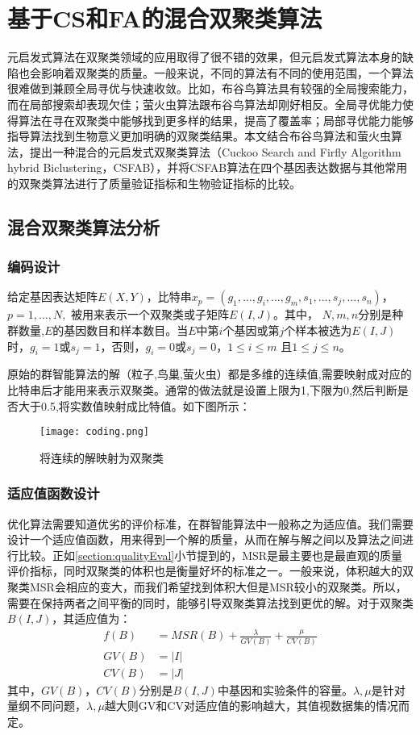 \chapter{基于CS和FA的混合双聚类算法}
元启发式算法在双聚类领域的应用取得了很不错的效果，但元启发式算法本身的缺陷也会影响着双聚类的质量。一般来说，不同的算法有不同的使用范围，一个算法很难做到兼顾全局寻优与快速收敛。比如，布谷鸟算法具有较强的全局搜索能力，而在局部搜索却表现欠佳；萤火虫算法跟布谷鸟算法却刚好相反。全局寻优能力使得算法在寻在双聚类中能够找到更多样的结果，提高了覆盖率；局部寻优能力能够指导算法找到生物意义更加明确的双聚类结果。本文结合布谷鸟算法和萤火虫算法，提出一种混合的元启发式双聚类算法（Cuckoo Search and Firfly Algorithm hybrid Biclustering，CSFAB），并将CSFAB算法在四个基因表达数据与其他常用的双聚类算法进行了质量验证指标和生物验证指标的比较。

\section{混合双聚类算法分析}
    \subsection{编码设计}
    给定基因表达矩阵$E(X,Y)$，比特串$x_p = (g_1,\dots,g_i,\dots,g_m,s_1,\dots,s_j,\dots,s_n)$，$ p=1,\dots,N, $ 被用来表示一个双聚类或子矩阵$E(I,J)$。其中， $N,m,n$分别是种群数量,$E$的基因数目和样本数目。当$E$中第$i$个基因或第$j$个样本被选为$E(I,J)$时，$g_i=1$或$s_j=1$，否则，$g_i=0$或$s_j=0$，$1\le i \le m$ 且$1\le j \le n$。

    原始的群智能算法的解（粒子,鸟巢,萤火虫）都是多维的连续值,需要映射成对应的比特串后才能用来表示双聚类。通常的做法就是设置上限为1,下限为0,然后判断是否大于0.5,将实数值映射成比特值。如下图所示：
    \begin{figure}[htbp]
        \centering
        \texttt{[image: coding.png]}
        \caption{将连续的解映射为双聚类}
        \label{fig:encoding}
    \end{figure}

    \subsection{适应值函数设计}\label{sec:fitness}
    优化算法需要知道优劣的评价标准，在群智能算法中一般称之为适应值。我们需要设计一个适应值函数，用来得到一个解的质量，从而在解与解之间以及算法之间进行比较。正如\ref{section:qualityEval}小节提到的，MSR是最主要也是最直观的质量评价指标，同时双聚类的体积也是衡量好坏的标准之一。一般来说，体积越大的双聚类MSR会相应的变大，而我们希望找到体积大但是MSR较小的双聚类。所以，需要在保持两者之间平衡的同时，能够引导双聚类算法找到更优的解。对于双聚类$B(I,J)$，其适应值为：
    \begin{align}
      f(B) &= MSR(B) + \frac{\lambda}{GV(B)} +\frac{\mu}{CV(B)} \\
      GV(B) & = |I| \\
      CV(B) & = |J|
    \end{align}
    其中，$GV(B)$，$CV(B)$分别是$B(I,J)$中基因和实验条件的容量。$\lambda,\mu$是针对量纲不同问题，$\lambda,\mu$越大则GV和CV对适应值的影响越大，其值视数据集的情况而定。
    
